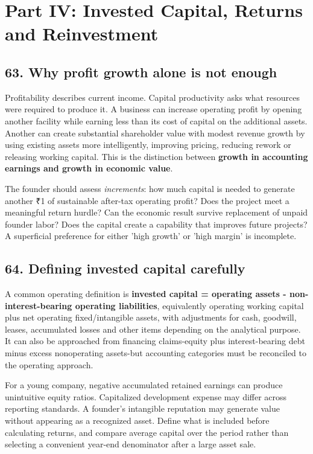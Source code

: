 \section{Part IV: Invested Capital, Returns and Reinvestment}

\subsection{63. Why profit growth alone is not enough}


Profitability describes current income. Capital productivity asks what resources were required to produce it. A business can increase operating profit by opening another facility while earning less than its cost of capital on the additional assets. Another can create substantial shareholder value with modest revenue growth by using existing assets more intelligently, improving pricing, reducing rework or releasing working capital. This is the distinction between \textbf{growth in accounting earnings and growth in economic value}.

The founder should assess \textit{increments}: how much capital is needed to generate another ₹1 of sustainable after-tax operating profit? Does the project meet a meaningful return hurdle? Can the economic result survive replacement of unpaid founder labor? Does the capital create a capability that improves future projects? A superficial preference for either 'high growth' or 'high margin' is incomplete.

\subsection{64. Defining invested capital carefully}


A common operating definition is \textbf{invested capital = operating assets - non-interest-bearing operating liabilities}, equivalently operating working capital plus net operating fixed/intangible assets, with adjustments for cash, goodwill, leases, accumulated losses and other items depending on the analytical purpose. It can also be approached from financing claims-equity plus interest-bearing debt minus excess nonoperating assets-but accounting categories must be reconciled to the operating approach.

For a young company, negative accumulated retained earnings can produce unintuitive equity ratios. Capitalized development expense may differ across reporting standards. A founder's intangible reputation may generate value without appearing as a recognized asset. Define what is included before calculating returns, and compare average capital over the period rather than selecting a convenient year-end denominator after a large asset sale.

